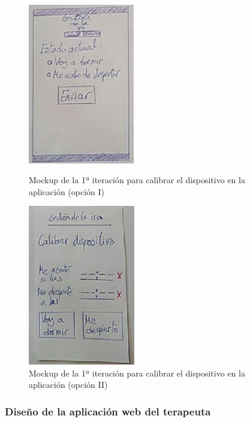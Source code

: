 \begin{figure}[H]
    \centering
    \begin{minipage}{.4\textwidth}
        \centering
        \includegraphics[width=0.8\linewidth, height=7cm]{Imagenes/04DescProblema/mockups/v1/android/03-calibrar.png}
        \caption[Mockup de la 1ª iteración para calibrar el dispositivo en la aplicación (opción I)]{Mockup de la 1ª iteración para calibrar el dispositivo en la aplicación (opción I)}
        \label{c4:fig:v1:android:calibrar}
    \end{minipage}
    \hfill\vline\hfill
    \begin{minipage}{.4\textwidth}
        \centering
        \includegraphics[width=0.8\linewidth, height=7cm]{Imagenes/04DescProblema/mockups/v1/android/03-calibrar-2.png}
        \caption[Mockup de la 1ª iteración para calibrar el dispositivo en la aplicación (opción II)]{Mockup de la 1ª iteración para calibrar el dispositivo en la aplicación (opción II)}
        \label{c4:fig:v1:android:calibrar2}
    \end{minipage}
\end{figure}

\subsubsection{Diseño de la aplicación web del terapeuta}

